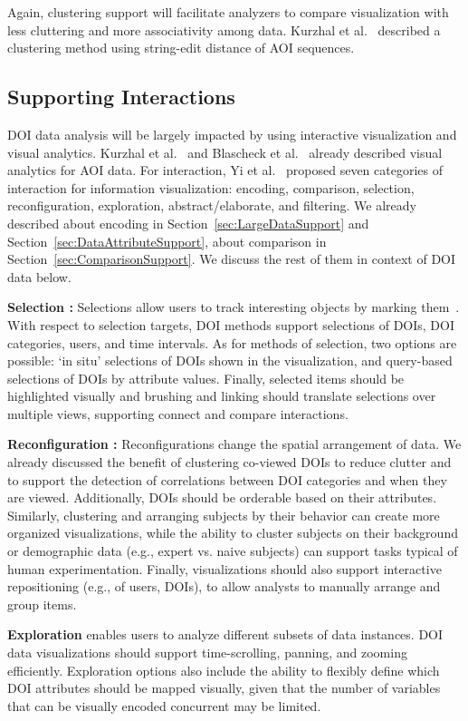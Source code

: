 Again, clustering support will facilitate analyzers to compare visualization with less cluttering and more associativity among data. Kurzhal et al.~\cite{Kur14} described a clustering method using string-edit distance of AOI sequences. 

\subsection{Supporting Interactions}
DOI data analysis will be largely impacted by using interactive visualization and visual analytics. Kurzhal et al.~\cite{Kur14} and Blascheck et al.~\cite{Bla16} already described visual analytics for AOI data. For interaction, Yi et al.~\cite{Yi07} proposed seven categories of interaction for information visualization: encoding, comparison, selection, reconfiguration, exploration, abstract/elaborate, and filtering. We already described about encoding in Section~\ref{sec:LargeDataSupport} and Section~\ref{sec:DataAttributeSupport}, about comparison in Section~\ref{sec:ComparisonSupport}. We discuss the rest of them in context of DOI data below. 

\noindent \textbf{Selection :} Selections allow users to track interesting objects by marking them~\cite{Yi07}. With respect to selection targets, DOI methods support selections of DOIs, DOI categories, users, and time intervals.  As for methods of selection, two options are possible: `in situ' selections of DOIs shown in the visualization, and query-based selections of DOIs by attribute values. Finally, selected items should be highlighted visually and brushing and linking should translate selections over multiple views, supporting connect and compare interactions. 

\noindent \textbf{Reconfiguration :}
Reconfigurations change the spatial arrangement of data.  We already discussed the benefit of clustering co-viewed DOIs to reduce clutter and to support the detection of correlations between DOI categories and when they are viewed. Additionally, DOIs should be orderable based on their attributes. Similarly, clustering and arranging subjects by their behavior can create more organized visualizations, while the ability to cluster subjects on their background or demographic data (e.g., expert vs. naive subjects) can support tasks typical of human experimentation. Finally, visualizations should also support interactive repositioning (e.g., of users, DOIs), to allow analysts to manually arrange and group items.


\noindent \textbf{Exploration} enables users to analyze different subsets of data instances. DOI data visualizations should support time-scrolling, panning, and zooming efficiently. Exploration options also include the ability to flexibly define which DOI attributes should be mapped visually, given that the number of variables that can be visually encoded concurrent may be limited. 
	
